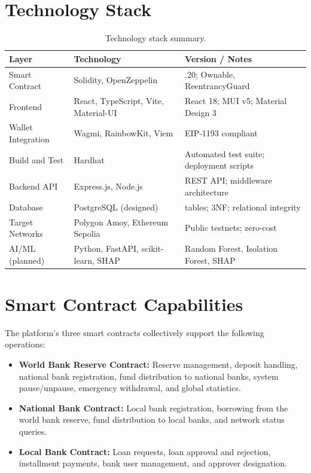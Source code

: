 \documentclass[12pt,a4paper]{report}
\newcommand{\tableheadfont}{\bfseries\small\color{PrimaryBlue}}
\newenvironment{moderntable}[1][H]{%
    \begin{table}[#1]\centering\small%
    \renewcommand{\arraystretch}{1.35}%
}{%
    \end{table}%
}
\begin{document}
\appendix

\chapter{Technology Stack}

\begin{moderntable}
\caption{Technology stack summary.}
\begin{tabular}{@{} >{\raggedright}p{3cm} >{\raggedright}p{4.5cm} >{\raggedright\arraybackslash}p{4.5cm} @{}}
\toprule
\tableheadfont Layer & \tableheadfont Technology & \tableheadfont Version / Notes \\
\midrule
\rowcolor{RowShade}
Smart Contract & Solidity, OpenZeppelin & 0.8.20; Ownable, ReentrancyGuard \\
Frontend & React, TypeScript, Vite, Material-UI & React 18; MUI v5; Material Design 3 \\
\rowcolor{RowShade}
Wallet Integration & Wagmi, RainbowKit, Viem & EIP-1193 compliant \\
Build and Test & Hardhat & Automated test suite; deployment scripts \\
\rowcolor{RowShade}
Backend API & Express.js, Node.js & REST API; middleware architecture \\
Database & PostgreSQL (designed) & 15 tables; 3NF; relational integrity \\
\rowcolor{RowShade}
Target Networks & Polygon Amoy, Ethereum Sepolia & Public testnets; zero-cost \\
AI/ML (planned) & Python, FastAPI, scikit-learn, SHAP & Random Forest, Isolation Forest, SHAP \\
\bottomrule
\end{tabular}
\end{moderntable}

\chapter{Smart Contract Capabilities}

The platform's three smart contracts collectively support the following operations:

\begin{itemize}[noitemsep]
\item \textbf{World Bank Reserve Contract:} Reserve management, deposit handling, national bank registration, fund distribution to national banks, system pause/unpause, emergency withdrawal, and global statistics.
\item \textbf{National Bank Contract:} Local bank registration, borrowing from the world bank reserve, fund distribution to local banks, and network status queries.
\item \textbf{Local Bank Contract:} Loan requests, loan approval and rejection, installment payments, bank user management, and approver designation.
\end{itemize}
\end{document}
